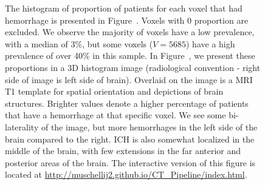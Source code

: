 \documentclass[10pt]{article}\usepackage[]{graphicx}\usepackage[]{color}
\begin{document}
\begin{figure}[htbp]
\centering

\caption{The histogram of proportion of patients for each voxel that had hemorrhage is presented in Figure~\protect{}. Voxels with 0 proportion are excluded.  We observe the majority of voxels have a low prevalence, with a median of 3\%, but some voxels ($V = 5685$) have a high prevalence of over 40\% in this sample.  In Figure~\protect{}, we present these proportions in a 3D histogram image (radiological convention - right side of image is left side of brain).  Overlaid on the image is a MRI T1 template for spatial orientation and depictions of brain structures.  Brighter values denote a higher percentage of patients that have a hemorrhage at that specific voxel. We see some bi-laterality of the image, but more hemorrhages in the left side of the brain compared to the right.  ICH is also somewhat localized in the middle of the brain, with few extensions in the far anterior and posterior areas of the brain.   The interactive version of this figure is located at \url{http://muschellij2.github.io/CT_Pipeline/index.html}.}
  \label{fig:StrokeHist}
\end{figure}
\end{document}
